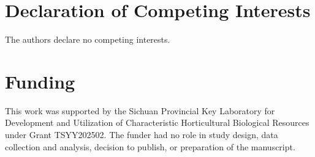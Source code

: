 \documentclass[fleqn,10pt]{wlscirep}
\begin{document}
\section*{Declaration of Competing Interests}

The authors declare no competing interests.

\section*{Funding}

This work was supported by the Sichuan Provincial Key Laboratory for Development and Utilization of Characteristic Horticultural Biological Resources under Grant TSYY202502. The funder had no role in study design, data collection and analysis, decision to publish, or preparation of the manuscript.


\end{document}
